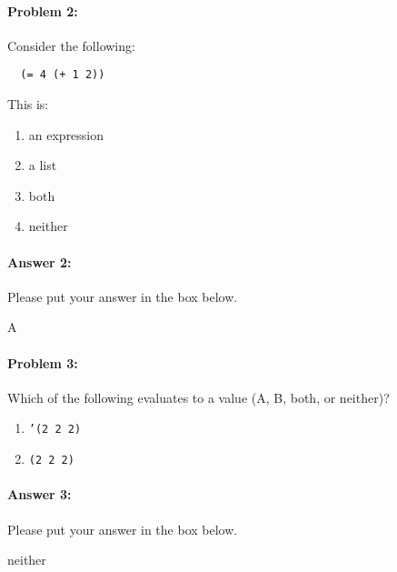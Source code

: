 \documentclass[10pt]{article}
\newenvironment{AnswerBox}{\begin{mdframed}[style=simple]}{\end{mdframed}}
\begin{document}
\noindent\hrulefill%

\paragraph{Problem 2:} Consider the following:
\begin{lstlisting}
  (= 4 (+ 1 2))
\end{lstlisting}
This is:
\begin{enumerate}[nosep, label=\Alph*.]
  \item an expression
  \item a list
  \item both
  \item neither
\end{enumerate}

\paragraph{Answer 2:} Please put your answer in the box below.

\begin{AnswerBox}%

    A

\end{AnswerBox}%

\hrulefill%

\paragraph{Problem 3:} Which of the following evaluates to a value (A, B, both,
or neither)?

\begin{enumerate}[nosep, label=\Alph*.]
  \item \texttt{'(2 2 2)}
  \item \texttt{(2 2 2)}
\end{enumerate}

\paragraph{Answer 3:} Please put your answer in the box below.

\begin{AnswerBox}%

  neither

\end{AnswerBox}%
\end{document}
